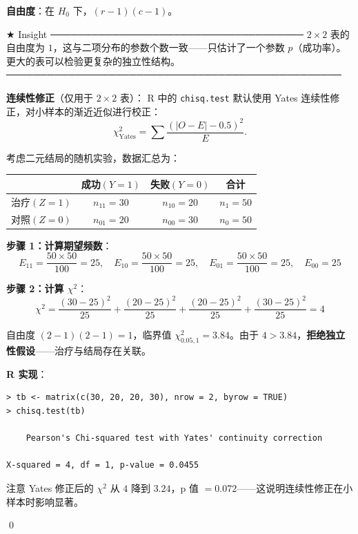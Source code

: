 \textbf{自由度}：在 $H_0$ 下，$(r-1)(c-1)$。

★ Insight ─────────────────────────────────────
$2 \times 2$ 表的自由度为 $1$，这与二项分布的参数个数一致——只估计了一个参数 $p$（成功率）。更大的表可以检验更复杂的独立性结构。
─────────────────────────────────────────────────

\textbf{连续性修正}（仅用于 $2 \times 2$ 表）：
R 中的 \texttt{chisq.test} 默认使用 Yates 连续性修正，对小样本的渐近近似进行校正：
\[
\chi^2_{\text{Yates}} = \sum \frac{(|O - E| - 0.5)^2}{E}.
\]

\begin{Example}\label{ex:2x2-chi-square}
考虑二元结局的随机实验，数据汇总为：

\begin{center}
\begin{tabular}{lccc}
\hline
        & 成功$(Y=1)$ & 失败$(Y=0)$ & 合计\\\hline
治疗$(Z=1)$ & $n_{11}=30$ & $n_{10}=20$ & $n_1=50$ \\
对照$(Z=0)$ & $n_{01}=20$ & $n_{00}=30$ & $n_0=50$ \\\hline
\end{tabular}
\end{center}

\textbf{步骤 1：计算期望频数}：
\[
E_{11} = \frac{50 \times 50}{100} = 25, \quad
E_{10} = \frac{50 \times 50}{100} = 25, \quad
E_{01} = \frac{50 \times 50}{100} = 25, \quad
E_{00} = 25
\]

\textbf{步骤 2：计算 $\chi^2$}：
\[
\chi^2 = \frac{(30-25)^2}{25} + \frac{(20-25)^2}{25} + \frac{(20-25)^2}{25} + \frac{(30-25)^2}{25} = 4
\]

自由度 $(2-1)(2-1)=1$，临界值 $\chi^2_{0.05,1} = 3.84$。由于 $4 > 3.84$，\textbf{拒绝独立性假设}——治疗与结局存在关联。

\textbf{R 实现}：
\begin{verbatim}
> tb <- matrix(c(30, 20, 20, 30), nrow = 2, byrow = TRUE)
> chisq.test(tb)

    Pearson's Chi-squared test with Yates' continuity correction

X-squared = 4, df = 1, p-value = 0.0455
\end{verbatim}

注意 Yates 修正后的 $\chi^2$ 从 $4$ 降到 $3.24$，p 值 $= 0.072$——这说明连续性修正在小样本时影响显著。

\qed
\end{Example}

